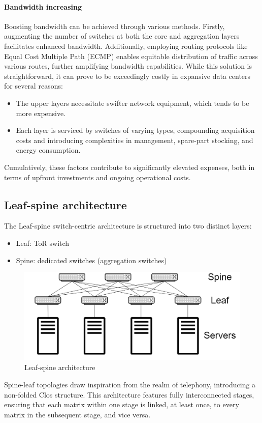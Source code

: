 \paragraph*{Bandwidth increasing}
Boosting bandwidth can be achieved through various methods. 
Firstly, augmenting the number of switches at both the core and aggregation layers facilitates enhanced bandwidth. 
Additionally, employing routing protocols like Equal Cost Multiple Path (ECMP) enables equitable distribution of traffic across various routes, further amplifying bandwidth capabilities.
While this solution is straightforward, it can prove to be exceedingly costly in expansive data centers for several reasons:
\begin{itemize}
    \item The upper layers necessitate swifter network equipment, which tends to be more expensive.
    \item Each layer is serviced by switches of varying types, compounding acquisition costs and introducing complexities in management, spare-part stocking, and energy consumption.
\end{itemize}
Cumulatively, these factors contribute to significantly elevated expenses, both in terms of upfront investments and ongoing operational costs.

\subsection{Leaf-spine architecture}
The Leaf-spine switch-centric architecture is structured into two distinct layers: 
\begin{itemize}
    \item Leaf: ToR switch
    \item Spine: dedicated switches (aggregation switches)
\end{itemize}
\begin{figure}[H]
    \centering
    \includegraphics[width=0.6\linewidth]{images/ls.png}
    \caption{Leaf-spine architecture}
\end{figure}
Spine-leaf topologies draw inspiration from the realm of telephony, introducing a non-folded Clos structure.
This architecture features fully interconnected stages, ensuring that each matrix within one stage is linked, at least once, to every matrix in the subsequent stage, and vice versa.

